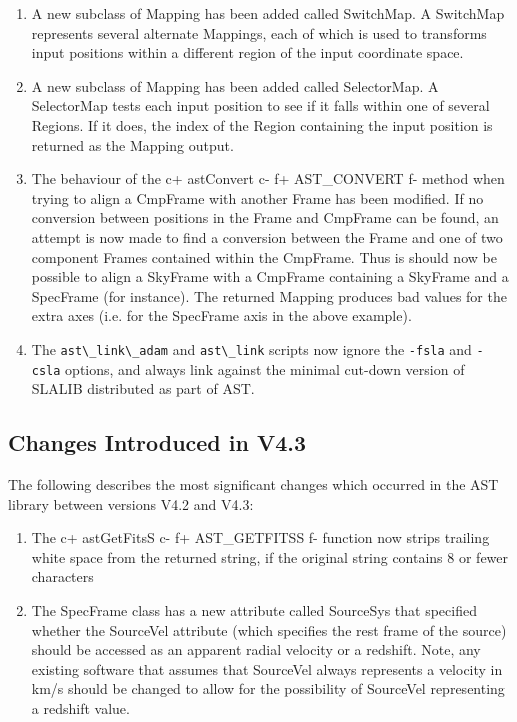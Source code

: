 \documentclass[twoside,11pt]{article}
\begin{document}
\begin{enumerate}
\item A new subclass of Mapping has been added called SwitchMap. A
SwitchMap represents several alternate Mappings, each of which is used to
transforms input positions within a different region of the input
coordinate space.

\item A new subclass of Mapping has been added called SelectorMap. A
SelectorMap tests each input position to see if it falls within one of
several Regions. If it does, the index of the Region containing the
input position is returned as the Mapping output.

\item The behaviour of the
c+
astConvert
c-
f+
AST\_CONVERT
f-
method when trying to align a CmpFrame with another Frame has been
modified. If no conversion between positions in the Frame and CmpFrame 
can be found, an attempt is now made to find a conversion between the
Frame and one of two component Frames contained within the CmpFrame. Thus
is should now be possible to align a SkyFrame with a CmpFrame containing a
SkyFrame and a SpecFrame (for instance). The returned Mapping produces bad
values for the extra axes (i.e. for the SpecFrame axis in the above example).

\item The \verb+ast\_link\_adam+ and \verb+ast\_link+ scripts now ignore the 
\verb+-fsla+ and \verb+-csla+ options, and always link against the
minimal cut-down version of SLALIB distributed as part of AST.

\end{enumerate}

\subsection{Changes Introduced in V4.3}

The following describes the most significant changes which occurred in the 
AST library between versions V4.2 and V4.3:

\begin{enumerate}

\item The 
c+
astGetFitsS 
c-
f+
AST\_GETFITSS
f-
function now strips trailing white space from the returned string, if the 
original string contains 8 or fewer characters

\item The SpecFrame class has a new attribute called SourceSys that specified
whether the SourceVel attribute (which specifies the rest frame of the 
source) should be accessed as an apparent radial velocity or a redshift.
Note, any existing software that assumes that SourceVel always represents
a velocity in km/s should be changed to allow for the possibility of
SourceVel representing a redshift value.

\end{enumerate}
\end{document}
